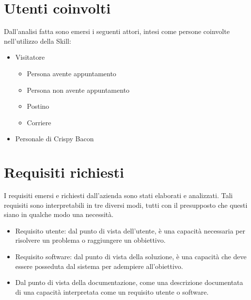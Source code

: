 \section{Utenti coinvolti}
Dall'analisi fatta sono emersi i seguenti attori, intesi come persone coinvolte nell'utilizzo della Skill:
\begin{itemize}
    \item Visitatore
        \begin{itemize}
            \item Persona avente appuntamento
            \item Persona non avente appuntamento
            \item Postino
            \item Corriere
        \end{itemize}
    \item Personale di Crispy Bacon
\end{itemize}

\section{Requisiti richiesti}
\label{requisti-richiesti}
I requisiti emersi e richiesti dall'azienda sono stati elaborati e analizzati. Tali requisiti sono interpretabili in tre diversi modi, tutti con il presupposto che questi siano in qualche modo una necessità.
\begin{itemize}
    \item Requisito utente: dal punto di vista dell'utente, è una capacità necessaria per risolvere un problema o raggiungere un obbiettivo.
    \item Requisito software: dal punto di vista della soluzione, è una capacità che deve essere posseduta dal sistema per adempiere all'obiettivo.
    \item Dal punto di vista della documentazione, come una descrizione documentata di una capacità interpretata come un requisito utente o software.
\end{itemize}
